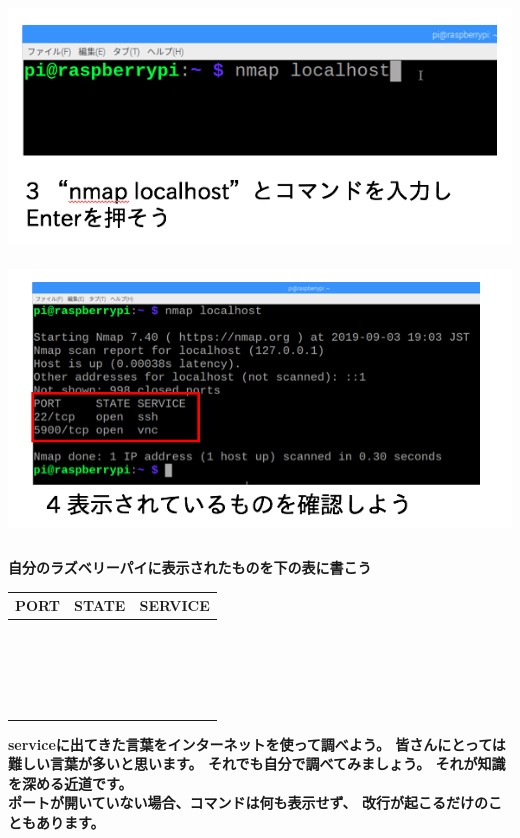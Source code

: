 \documentclass[a4paper,12pt,dvipdfmx]{jarticle}
\begin{document}
\includegraphics[width=14.404cm,height=6.722cm]{ome7-img032.png}
\bigskip
\includegraphics[width=14.542cm,height=7.458cm]{ome7-img031.png}
\flushleft

\bigskip
{\bfseries
自分のラズベリーパイに表示されたものを下の表に書こう}

\begin{flushleft}
\tablefirsthead{}
\tablehead{}
\tabletail{}
\tablelasttail{}
\begin{supertabular}{|m{5.467cm}|m{5.4690003cm}|m{5.155cm}|}
\hline
PORT &
STATE &
SERVICE\\\hline
~
 &
~
 &
~
\\\hline
~
 &
~
 &
~
\\\hline
~
 &
~
 &
~
\\\hline
~
 &
~
 &
~
\\\hline
\end{supertabular}
\end{flushleft}
{\bfseries
serviceに出てきた言葉をインターネットを使って調べよう。
皆さんにとっては難しい言葉が多いと思います。
それでも自分で調べてみましょう。
それが知識を深める近道です。\\
ポートが開いていない場合、コマンドは何も表示せず、
改行が起こるだけのこともあります。
}
\end{document}
